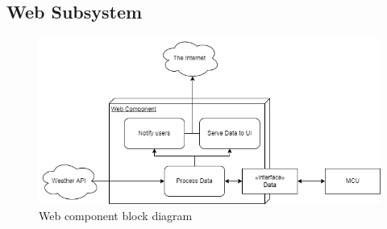 \subsection{Web Subsystem}
\label{sec:web_subsystem}
\begin{figure}[H]
    \caption{Web component block diagram}
    \centering
    \includegraphics[width=\textwidth]{images/WebBlock.png}
\end{figure}